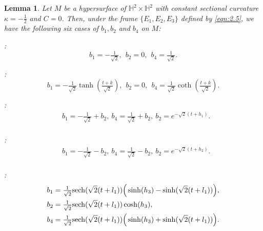\documentclass[reqno]{amsart}%
\newtheorem{lemma}[theorem]{Lemma}
\theoremstyle{definition}
\numberwithin{equation}{section}
\begin{document}
\begin{lemma}\label{lemma:4.1aaa1}
Let $M$ be a hypersurface of $\mathbb{H}^2\times \mathbb{H}^2$ with constant sectional curvature $\kappa=-\frac{1}{2}$ and $C=0$.
Then, under the frame $\{E_1,E_2,E_3\}$ defined by \eqref{eqn:2.5}, we have the following six cases
of $b_1,b_2$ and $b_4$ on $M$:

:
$$
b_1=-\tfrac{1}{\sqrt{2}},\ \ b_2=0,\ \
b_4=\tfrac{1}{\sqrt{2}}.
$$


:
$$
b_1=-\tfrac{1}{\sqrt{2}}\tanh(\tfrac{t+k}{\sqrt{2}}),\ \ b_2=0,\ \
b_4=\tfrac{1}{\sqrt{2}}\coth(\tfrac{t+k}{\sqrt{2}}).
$$

:
\begin{equation}\label{eq:jj1}
\begin{aligned}
&b_1=-\tfrac{1}{\sqrt{2}}+b_2,\ b_4=\tfrac{1}{\sqrt{2}}+b_2,\ b_2=e^{-\sqrt{2}(t+h_1)}.\\
\end{aligned}	
\end{equation}


:
\begin{equation}\label{eq:jj2}
\begin{aligned}
&b_1=-\tfrac{1}{\sqrt{2}}-b_2,\ b_4=\tfrac{1}{\sqrt{2}}-b_2,\ b_2=e^{-\sqrt{2}(t+h_2)}.\\
\end{aligned}	
\end{equation}

:
\begin{equation}\label{eq:jj3}
\begin{aligned}
b_1&=\tfrac{1}{\sqrt{2}}{\rm sech}(\sqrt{2}(t+l_1))\Big(\sinh (h_3)-\sinh(\sqrt{2}(t+l_1))\Big),\\
b_2&=\tfrac{1}{\sqrt{2}}{\rm sech}(\sqrt{2}(t+l_1))\cosh (h_3) ,\\
b_4&=\tfrac{1}{\sqrt{2}}{\rm sech}(\sqrt{2}(t+l_1))\Big(\sinh (h_3)+\sinh(\sqrt{2}(t+l_1))\Big).
\end{aligned}	
\end{equation}



\end{lemma}
\end{document}
